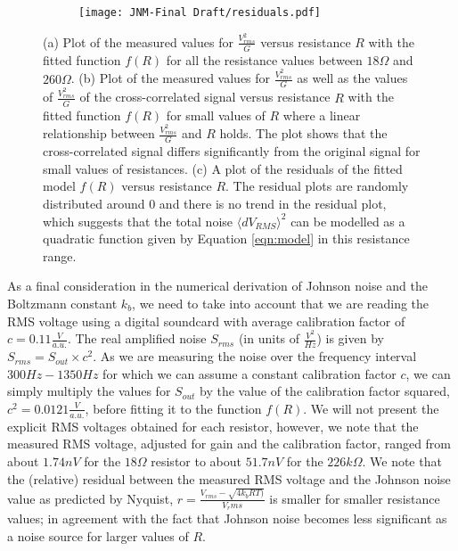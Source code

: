 \begin{linenumbers}
\begin{figure}[h]
\begin{subfigure}{0.4\textwidth}
    \texttt{[image: JNM-Final Draft/residuals.pdf]}
   \label{fig:second}
\end{subfigure}
\caption{(a) Plot of the measured values for $\frac{V^2_{rms}}{G}$ versus resistance $R$ with the fitted function $f(R)$ for all the resistance values between $18 \Omega$ and $260 \Omega$. (b) Plot of the measured values for $\frac{V^2_{rms}}{G}$ as well as the values of $\frac{V^2_{rms}}{G}$ of the cross-correlated signal versus resistance $R$ with the fitted function $f(R)$ for small values of $R$ where a linear relationship between  $\frac{V^2_{rms}}{G}$ and $R$ holds. The plot shows that the cross-correlated signal differs significantly from the original signal for small values of resistances. (c) A plot of the residuals of the fitted model $f(R)$ versus resistance $R$. The residual plots are randomly distributed around 0 and there is no trend in the residual plot, which suggests that the total noise $\langle dV_{RMS}\rangle ^2$ can be modelled as a quadratic function given by Equation \ref{eqn:model} in this resistance range.}
\label{fig:figures}
\end{figure}
As a final consideration in the numerical derivation of Johnson noise and the Boltzmann constant $k_b$, we need to take into account that we are reading the RMS voltage using a digital soundcard with average calibration factor of $c=0.11 \frac{V}{a.u.}$. The real amplified noise $S_{rms}$ (in units of $\frac{V^2}{Hz}$) is given by $S_{rms}=S_{out}\times c^2$. As we are measuring the noise over the frequency interval $300Hz-1350Hz$ for which we can assume a constant calibration factor $c$, we can simply multiply the values for $S_{out}$ by the value of the calibration factor squared, $c^2=0.0121 \frac{V}{a.u.}$, before fitting it to the function $f(R)$. We will not present the explicit RMS voltages obtained for each resistor, however, we note that the measured RMS voltage, adjusted for gain and the calibration factor, ranged from about $1.74nV$ for the $18\Omega$ resistor to about $51.7 nV$ for the $226 k\Omega$. We note that the (relative) residual between the measured RMS voltage and the Johnson noise value as predicted by Nyquist, $r=\frac{V_{rms} - \sqrt{4k_bRT)}}{V_rms}$ is smaller for smaller resistance values; in agreement with the fact that Johnson noise becomes less significant as a noise source for larger values of $R$. 




\end{linenumbers}
